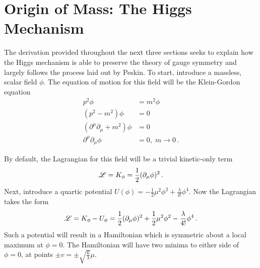 \section{Origin of Mass: The Higgs Mechanism}\label{sec:higgs_mechanism}

    The derivation provided throughout the next three sections seeks to explain
        how the Higgs mechanism is able to preserve the theory of gauge symmetry
        and largely follows the process laid out by Peskin\cite{Peskin_book}.
    To start, introduce a massless, scalar field $\phi$.
    The equation of motion for this field will be the Klein-Gordon equation
    \begin{equation} \begin{split}
        p^2 \phi &= m^2 \phi
        \\(p^2 - m^2) \phi &= 0
        \\(\partial^\mu \partial_\mu + m^2) \phi &= 0
        \\\partial^\mu \partial_\mu \phi &= 0,\; m\to0
        \,.
    \end{split} \end{equation}

    By default, the Lagrangian for this field will be a trivial kinetic-only term
    \begin{equation}
        \mathscr{L} = K_{\phi} = \frac{1}{2} (\partial_{\mu} \phi)^2
        \,.
    \end{equation}
    Next, introduce a quartic potential $U(\phi) = -\frac{1}{2} \mu^2 \phi^2 + \frac{\lambda}{4!} \phi^4$.
    Now the Lagrangian takes the form
    \begin{equation}
        \mathscr{L} = K_{\phi} - U_{\phi} = \frac{1}{2} (\partial_{\mu} \phi)^2 
            +\frac{1}{2} \mu^2 \phi^2 - \frac{\lambda}{4!} \phi^4
        \,.
    \end{equation}
    Such a potential will result in a Hamiltonian which is symmetric about a local maximum at $\phi=0$.
    The Hamiltonian will have two minima to either side of $\phi=0$, at points $\pm v = \pm \sqrt{\frac{6}{\lambda}} \mu$.

